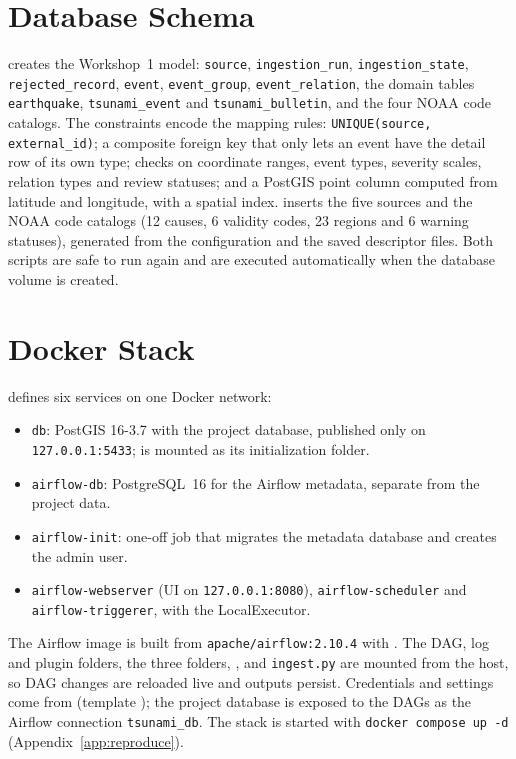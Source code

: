 \documentclass[a4paper,11pt,oneside]{book}
\begin{document}
\section{Database Schema}
 creates the Workshop~1 model: \texttt{source}, \texttt{ingestion\_run}, \texttt{ingestion\_state}, \texttt{rejected\_record}, \texttt{event}, \texttt{event\_group}, \texttt{event\_relation}, the domain tables \texttt{earthquake}, \texttt{tsunami\_event} and \texttt{tsunami\_bulletin}, and the four NOAA code catalogs.
The constraints encode the mapping rules: \texttt{UNIQUE(source, external\_id)}; a composite foreign key that only lets an event have the detail row of its own type; checks on coordinate ranges, event types, severity scales, relation types and review statuses; and a PostGIS point column computed from latitude and longitude, with a spatial index.
 inserts the five sources and the NOAA code catalogs (12 causes, 6 validity codes, 23 regions and 6 warning statuses), generated from the configuration and the saved descriptor files.
Both scripts are safe to run again and are executed automatically when the database volume is created.

\section{Docker Stack}
 defines six services on one Docker network:
\begin{itemize}[nosep]
  \item \texttt{db}: PostGIS 16-3.7 with the project database, published only on \texttt{127.0.0.1:5433};  is mounted as its initialization folder.
  \item \texttt{airflow-db}: PostgreSQL~16 for the Airflow metadata, separate from the project data.
  \item \texttt{airflow-init}: one-off job that migrates the metadata database and creates the admin user.
  \item \texttt{airflow-webserver} (UI on \texttt{127.0.0.1:8080}), \texttt{airflow-scheduler} and \texttt{airflow-triggerer}, with the LocalExecutor.
\end{itemize}
The Airflow image is built from \texttt{apache/airflow:2.10.4} with .
The DAG, log and plugin folders, the three  folders, ,  and \texttt{ingest.py} are mounted from the host, so DAG changes are reloaded live and outputs persist.
Credentials and settings come from  (template ); the project database is exposed to the DAGs as the Airflow connection \texttt{tsunami\_db}.
The stack is started with \texttt{docker compose up -d} (Appendix~\ref{app:reproduce}).
\end{document}
